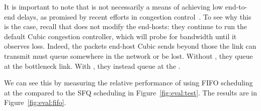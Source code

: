  It is important to note that \name is not necessarily a means of achieving low end-to-end delays, as promised by recent efforts in congestion control~\cite{copa, nimbus}. 
To see why this is the case, recall that \name does not modify the end-hosts: they continue to run the default Cubic congestion controller, which will probe for bandwidth until it observes loss.
Indeed, the packets end-host Cubic sends beyond those the link can transmit must queue somewhere in the network or be lost. Without \name, they queue at the bottleneck link.
With \name, they instead queue at the \inbox.

We can see this by measuring the relative performance of using FIFO scheduling at the \name compared to the SFQ scheduling in Figure~\ref{fig:eval:test}.
The results are in Figure~\ref{fig:eval:fifo}. 


